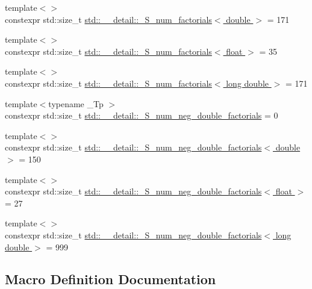 \begin{DoxyCompactItemize}
\item 
{\footnotesize template$<$$>$ }\\constexpr std\+::size\+\_\+t \hyperlink{namespacestd_1_1____detail_ad415b9ec36471d7aca4ebcd22cb7b216}{std\+::\+\_\+\+\_\+detail\+::\+\_\+\+S\+\_\+num\+\_\+factorials$<$ double $>$} = 171
\item 
{\footnotesize template$<$$>$ }\\constexpr std\+::size\+\_\+t \hyperlink{namespacestd_1_1____detail_a3a29651303ca2222246ef6f0a17e92ec}{std\+::\+\_\+\+\_\+detail\+::\+\_\+\+S\+\_\+num\+\_\+factorials$<$ float $>$} = 35
\item 
{\footnotesize template$<$$>$ }\\constexpr std\+::size\+\_\+t \hyperlink{namespacestd_1_1____detail_ab90b8eb39ff963a5ed533a3be0b7f7fd}{std\+::\+\_\+\+\_\+detail\+::\+\_\+\+S\+\_\+num\+\_\+factorials$<$ long double $>$} = 171
\item 
{\footnotesize template$<$typename \+\_\+\+Tp $>$ }\\constexpr std\+::size\+\_\+t \hyperlink{namespacestd_1_1____detail_ac386f200e589ce1fc895c2aac0e47f8c}{std\+::\+\_\+\+\_\+detail\+::\+\_\+\+S\+\_\+num\+\_\+neg\+\_\+double\+\_\+factorials} = 0
\item 
{\footnotesize template$<$$>$ }\\constexpr std\+::size\+\_\+t \hyperlink{namespacestd_1_1____detail_a2d14a1207a6fea22f32586dfd41cf49d}{std\+::\+\_\+\+\_\+detail\+::\+\_\+\+S\+\_\+num\+\_\+neg\+\_\+double\+\_\+factorials$<$ double $>$} = 150
\item 
{\footnotesize template$<$$>$ }\\constexpr std\+::size\+\_\+t \hyperlink{namespacestd_1_1____detail_a3ce62e66e9a196fd89b4d841f7374d68}{std\+::\+\_\+\+\_\+detail\+::\+\_\+\+S\+\_\+num\+\_\+neg\+\_\+double\+\_\+factorials$<$ float $>$} = 27
\item 
{\footnotesize template$<$$>$ }\\constexpr std\+::size\+\_\+t \hyperlink{namespacestd_1_1____detail_a2ef051ec96e521e71489d2327d11c22a}{std\+::\+\_\+\+\_\+detail\+::\+\_\+\+S\+\_\+num\+\_\+neg\+\_\+double\+\_\+factorials$<$ long double $>$} = 999
\end{DoxyCompactItemize}


\subsection{Macro Definition Documentation}
\hypertarget{sf__gamma_8tcc_accc383e52e4dc6eebfd313a52961b49b}{}

